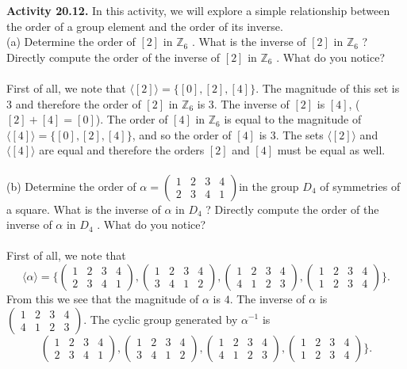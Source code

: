 \documentclass[11pt,a4paper]{article}
\begin{document}
{\bf Activity 20.12.} In this activity, we will explore a simple relationship between the order of a group element and the order of its inverse.\\
(a) Determine the order of $[2]$ in $\mathbb{Z}_6$ . What is the inverse of $[2]$ in $\mathbb{Z}_6$ ? Directly
compute the order of the inverse of $[2]$ in $\mathbb{Z}_6$ . What do you notice?\\
~\\
First of all, we note that $\langle [2] \rangle = \{[0],[2],[4]\}$. The magnitude of this set is $3$ and therefore the order of $[2]$ in $\mathbb{Z}_6$ is $3$. The inverse of $[2]$ is $[4]$, ($[2]+[4]=[0]$). The order of $[4]$ in $\mathbb{Z}_6$ is equal to the magnitude of $\langle [4] \rangle = \{[0],[2],[4]\}$, and so the order of $[4]$ is $3$. The sets $\langle [2] \rangle$ and $\langle [4] \rangle$ are equal and therefore the orders $[2]$ and $[4]$ must be equal as well.\\
~\\
(b) Determine the order of $\alpha = 
\begin{pmatrix}
1&2&3&4\\
2&3&4&1
\end{pmatrix}
$in the group $D_4$ of symmetries of a square. What is the inverse of $\alpha$ in $D_4$ ? Directly compute the order of the inverse of $\alpha$ in $D_4$ . What do you notice?\\
~\\
First of all, we note that \[\langle \alpha \rangle = \{
\begin{pmatrix}
1&2&3&4\\
2&3&4&1
\end{pmatrix},
\begin{pmatrix}
1&2&3&4\\
3&4&1&2
\end{pmatrix},
\begin{pmatrix}
1&2&3&4\\
4&1&2&3
\end{pmatrix},
\begin{pmatrix}
1&2&3&4\\
1&2&3&4
\end{pmatrix}
\}.\] From this we see that the magnitude of $\alpha$ is $4$. The inverse of $\alpha$ is $\begin{pmatrix}
1&2&3&4\\
4&1&2&3
\end{pmatrix}
$. The cyclic group generated by $\alpha^{-1}$ is 
\[
\begin{pmatrix}
1&2&3&4\\
2&3&4&1
\end{pmatrix},
\begin{pmatrix}
1&2&3&4\\
3&4&1&2
\end{pmatrix},
\begin{pmatrix}
1&2&3&4\\
4&1&2&3
\end{pmatrix},
\begin{pmatrix}
1&2&3&4\\
1&2&3&4
\end{pmatrix}
\}.\]
\end{document}
